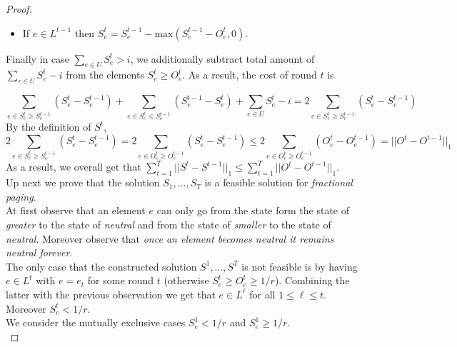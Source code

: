 \begin{proof}
\begin{enumerate}
\begin{itemize}
        \item If $e \in L^{t-1}$ then $S_e^t = S_e^{t-1} - \text{max}(S_e^{t-1} -O_e^t , 0)$.
    \end{itemize}
\end{enumerate}

\noindent Finally in case $\sum_{e \in U}S_e^t > i$, we additionally subtract total amount of $\sum_{e \in U}S_e^t - i$ from the elements $S_e^t \geq O_e^t$. As a result, the cost of round $t$ is

\[
\sum_{e \in S_e^t \geq S_e^{t-1}}(S_e^t - S_e^{t-1}) + \sum_{e \in S_e^t \leq S_e^{t-1}}(S_e^{t-1} - S_e^t) + \sum_{e \in U}S_e^t - i = 2 \sum_{e \in S_e^t \geq S_e^{t-1}}(S_e^t - S_e^{t-1})\]
By the definition of $S^t$, 
\[2\sum_{e \in S_e^t \geq S_e^{t-1}}(S_e^t - S_e^{t-1}) = 2\sum_{e \in O_e^t \geq O_e^{t-1}}(S_e^t - S_e^{t-1}) \leq 2\sum_{e \in O_e^t \geq O_e^{t-1}}(O_e^t - O_e^{t-1}) = ||O^t - O^{t-1}||_1 \]
As a result, we overall get that 
$\sum_{t=1}^T||S^t - S^{t-1}||_1 \leq  \sum_{t=1}^T||O^t - O^{t-1}||_1$.
\\

\noindent Up next we prove that the solution $S_1,\ldots,S_T$ is a feasible solution for \textit{fractional paging}.\\

\noindent At first observe that an element $e$ can only go from the state form the state of \textit{greater} to the state of \textit{neutral} 
and from the state of \textit{smaller} to the state of \textit{neutral}. Moreover observe that \textit{once an element becomes neutral it remains neutral forever}.\\

\noindent The only case that the constructed solution $S^1,\ldots,S^T$ is not feasible is by having $e \in L^t$ with $e=e_t$ for some round $t$ (otherwise $S_e^t \geq O_e^t \geq 1/r$). Combining the latter with the previous observation we get that $e \in L^\ell$ for all $1 \leq \ell \leq t$. Moreover $S_e^t < 1/r$.\\

\noindent We consider the mutually exclusive cases $S_e^1 < 1/r$ and $S_e^1 \geq 1/r$.\\


\end{proof}
